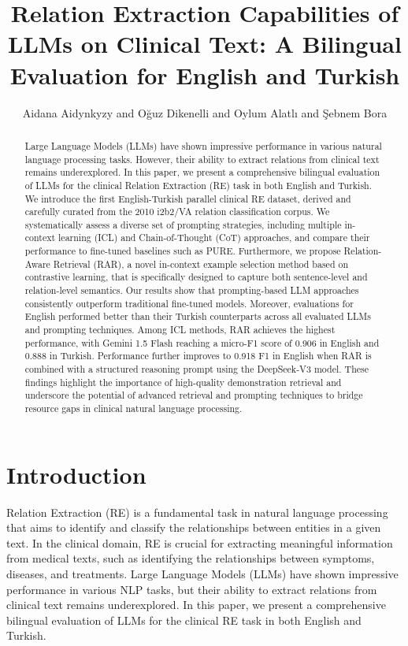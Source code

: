 \documentclass{article}
\title{Relation Extraction Capabilities of LLMs on Clinical Text: A Bilingual Evaluation for English and Turkish}
\author{Aidana Aidynkyzy and Oğuz Dikenelli and Oylum Alatlı and Şebnem Bora}
\begin{document}
\maketitle

\begin{abstract}
Large Language Models (LLMs) have shown impressive performance in various natural language processing tasks. However, their ability to extract relations from clinical text remains underexplored. In this paper, we present a comprehensive bilingual evaluation of LLMs for the clinical Relation Extraction (RE) task in both English and Turkish. We introduce the first English-Turkish parallel clinical RE dataset, derived and carefully curated from the 2010 i2b2/VA relation classification corpus. We systematically assess a diverse set of prompting strategies, including multiple in-context learning (ICL) and Chain-of-Thought (CoT) approaches, and compare their performance to fine-tuned baselines such as PURE. Furthermore, we propose Relation-Aware Retrieval (RAR), a novel in-context example selection method based on contrastive learning, that is specifically designed to capture both sentence-level and relation-level semantics. Our results show that prompting-based LLM approaches consistently outperform traditional fine-tuned models. Moreover, evaluations for English performed better than their Turkish counterparts across all evaluated LLMs and prompting techniques. Among ICL methods, RAR achieves the highest performance, with Gemini 1.5 Flash reaching a micro-F1 score of 0.906 in English and 0.888 in Turkish. Performance further improves to 0.918 F1 in English when RAR is combined with a structured reasoning prompt using the DeepSeek-V3 model. These findings highlight the importance of high-quality demonstration retrieval and underscore the potential of advanced retrieval and prompting techniques to bridge resource gaps in clinical natural language processing.
\end{abstract}

\section{Introduction}
Relation Extraction (RE) is a fundamental task in natural language processing that aims to identify and classify the relationships between entities in a given text. In the clinical domain, RE is crucial for extracting meaningful information from medical texts, such as identifying the relationships between symptoms, diseases, and treatments. Large Language Models (LLMs) have shown impressive performance in various NLP tasks, but their ability to extract relations from clinical text remains underexplored. In this paper, we present a comprehensive bilingual evaluation of LLMs for the clinical RE task in both English and Turkish.
\end{document}
